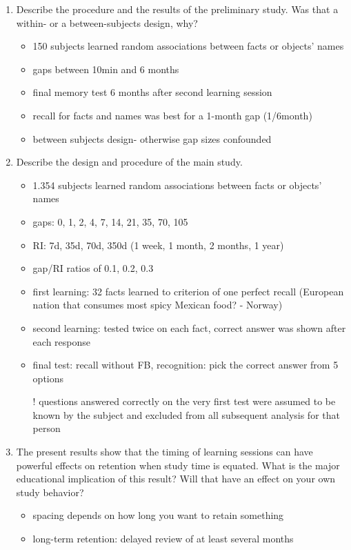 \documentclass[12pt,english]{scrartcl}
\begin{document}
\begin{enumerate}
 \item Describe the procedure and the results of the preliminary study. Was that a within- or a between-subjects design, why?

 \color{blue}
 \begin{itemize}
 \item 150 subjects learned random associations between facts or objects' names
 \item gaps between 10min and 6 months 
 \item final memory test 6 months after second learning session
 \item recall for facts and names was best for a 1-month gap (1/6month)
 \item between subjects design- otherwise gap sizes confounded
\end{itemize}
  \color{black}


 \item Describe the design and procedure of the main study.

 \color{blue}
 \begin{itemize}
 \item 1.354 subjects learned random associations between facts or objects' names
 \item gaps: 0, 1, 2, 4, 7, 14, 21, 35, 70, 105
 \item RI: 7d, 35d, 70d, 350d (1 week, 1 month, 2 months, 1 year)
 \item gap/RI ratios of 0.1, 0.2, 0.3
 \item first learning: 32 facts learned to criterion of one perfect recall (European nation that consumes most spicy Mexican food? - Norway)
 \item second learning: tested twice on each fact, correct answer was shown after each response
 \item final test: recall without FB, recognition: pick the correct answer from 5 options
 \item[!] questions answered correctly on the very first test were assumed to be known by the subject and excluded from all subsequent analysis for that person 
\end{itemize}
  \color{black}

\item The present results show that the timing of learning sessions can have powerful effects on retention when study time is equated. What is the major educational implication of this  result? Will that have an effect on your own study behavior?
 \color{blue}
 \begin{itemize}
 \item spacing depends on how long you want to retain something
 \item long-term retention: delayed review of at least several months 
\end{itemize}
  \color{black}



\end{enumerate}
\end{document}
